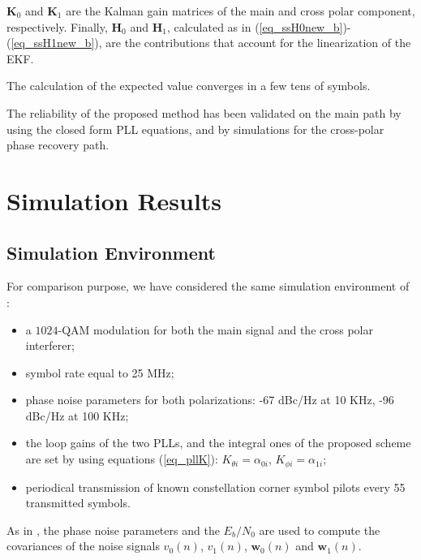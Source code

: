 $\mathbf{K}_0$ and $\mathbf{K}_1$ are the Kalman gain matrices of the main and cross polar component, respectively. Finally,  $\mathbf{H}_0$ and $\mathbf{H}_1$, calculated as in (\ref{eq_ssH0new_b})-(\ref{eq_ssH1new_b}), are the contributions that account for the linearization of the EKF.

The calculation of the expected value converges in a few tens of symbols.

The reliability of the proposed method has been validated on the main path by using the closed form PLL equations, and by simulations for the cross-polar phase recovery path.

\section{Simulation Results}
\label{Results}

\subsection{Simulation Environment}
\label{SE}
For comparison purpose, we have considered the same simulation environment  of \cite{CommLett}:
\begin{itemize}
	\item a $1024$-QAM modulation for both the main signal and the cross polar interferer;
	\item symbol rate equal to 25 MHz;
	\item phase noise parameters for both polarizations: -67 dBc/Hz at 10 KHz, -96 dBc/Hz at 100 KHz;
	\item the loop gains of the two PLLs, and the integral ones of the proposed scheme are set by using equations (\ref{eq_pllK}): $K_{\theta i}=\alpha_{0i}$, $K_{\phi i}=\alpha_{1i}$;
	\item periodical transmission of known constellation corner symbol pilots every 55 transmitted symbols.
\end{itemize}
As in \cite{CommLett}, the phase noise parameters and the $E_b/N_0$ are used to compute the covariances of the noise signals ${v}_0(n)$, ${v}_1(n)$, $\mathbf{w}_0(n)$ and $\mathbf{w}_1(n)$.

